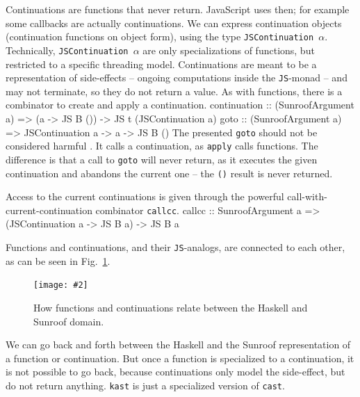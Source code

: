 \documentclass{llncs}
\newcommand{\Src}[1]{{\tt{#1}}}
\newcommand{\JS}{\Src{JS}}
\newcommand{\Figure}[3]{%
\FigureS{#1}{#2}{#3}{scale=0.55,clip=true,trim=0.45cm 0.45cm 0.45cm 0.45cm}
}
\newcommand{\FigureS}[4]{%
\begin{figure}[t]%
\begin{center}%
\texttt{[image: \#2]}%
\vspace{-0.5cm}%
\end{center}%
\caption{#3}%
\label{#1}%
\end{figure}%
}
\newenvironment{Code}{\verbatim}{\endverbatim}
\newcommand{\FigRef}[1]{Fig.~\ref{#1}}
\begin{document}
Continuations are functions that never return. JavaScript uses then; 
for example some callbacks are actually continuations. We can express
continuation objects (continuation functions on object form),
using the type \Src{JSContinuation $\alpha$}.
Technically, \Src{JSContinuation $\alpha$} are only
specializations of functions, but
restricted to a specific threading model. Continuations
are meant to be a representation of side-effects -- 
ongoing computations inside the \JS-monad -- and may  
not terminate, so they do not return a value. As with functions, 
there is a combinator to create and apply a continuation.
\begin{Code}
continuation :: (SunroofArgument a) 
             => (a -> JS B ()) -> JS t (JSContinuation a)
goto         :: (SunroofArgument a) 
             => JSContinuation a -> a -> JS B ()
\end{Code}
The presented \Src{goto} should not be considered 
harmful \cite{Dijkstra:68:GotoConsideredHarmful}.
It calls a continuation,
as \Src{apply} calls functions.
The difference is that a call to \Src{goto} will never
return, as it executes the given continuation and abandons the 
current one -- the \Src{()} result is never returned.

Access to the current continuations is given through
the powerful call-with-current-continuation 
combinator \Src{callcc}.
\begin{Code}
callcc :: SunroofArgument a 
       => (JSContinuation a -> JS B a) -> JS B a
\end{Code}

Functions and continuations, and their \Src{JS}-analogs,
are connected  to each other, as can be seen in \FigRef{fig:func-cont}.
\Figure%
{fig:func-cont}%
{figures/sunroof-func-cont.pdf}%
{How functions and continuations relate between the Haskell and Sunroof domain.}%
We can go back and forth between the Haskell and the Sunroof
representation of a function or continuation. But once a function
is specialized to a continuation, it is not possible to go back,
because continuations only model the side-effect, but do 
not return anything. \Src{kast} is just a specialized version of \Src{cast}.



\end{document}

